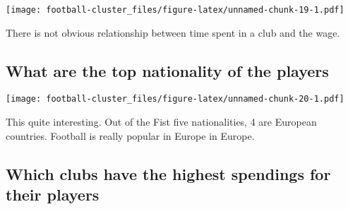 \documentclass[]{article}
\newenvironment{Shaded}{\begin{snugshade}}{\end{snugshade}}
\newcommand{\DataTypeTok}[1]{\textcolor[rgb]{0.13,0.29,0.53}{#1}}
\newcommand{\DecValTok}[1]{\textcolor[rgb]{0.00,0.00,0.81}{#1}}
\newcommand{\KeywordTok}[1]{\textcolor[rgb]{0.13,0.29,0.53}{\textbf{#1}}}
\newcommand{\NormalTok}[1]{#1}
\newcommand{\OperatorTok}[1]{\textcolor[rgb]{0.81,0.36,0.00}{\textbf{#1}}}
\newcommand{\StringTok}[1]{\textcolor[rgb]{0.31,0.60,0.02}{#1}}
\begin{document}
\texttt{[image: football-cluster\_files/figure-latex/unnamed-chunk-19-1.pdf]}

There is not obvious relationship between time spent in a club and the
wage.

\hypertarget{what-are-the-top-nationality-of-the-players}{%
\subsection{What are the top nationality of the
players}\label{what-are-the-top-nationality-of-the-players}}

\begin{Shaded}
\end{Shaded}

\texttt{[image: football-cluster\_files/figure-latex/unnamed-chunk-20-1.pdf]}

This quite interesting. Out of the Fist five nationalities, 4 are
European countries. Football is really popular in Europe in Europe.

\hypertarget{which-clubs-have-the-highest-spendings-for-their-players}{%
\subsection{Which clubs have the highest spendings for their
players}\label{which-clubs-have-the-highest-spendings-for-their-players}}

\begin{Shaded}
\end{Shaded}
\end{document}
